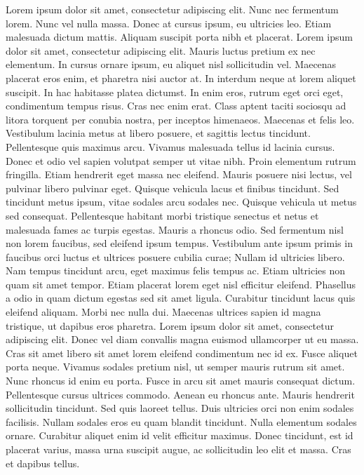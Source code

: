 Lorem ipsum dolor sit amet, consectetur adipiscing elit. Nunc nec fermentum lorem. Nunc vel nulla massa. Donec at cursus ipsum, eu ultricies leo. Etiam malesuada dictum mattis. Aliquam suscipit porta nibh et placerat. Lorem ipsum dolor sit amet, consectetur adipiscing elit. Mauris luctus pretium ex nec elementum. In cursus ornare ipsum, eu aliquet nisl sollicitudin vel. Maecenas placerat eros enim, et pharetra nisi auctor at.
In interdum neque at lorem aliquet suscipit. In hac habitasse platea dictumst. In enim eros, rutrum eget orci eget, condimentum tempus risus. Cras nec enim erat. Class aptent taciti sociosqu ad litora torquent per conubia nostra, per inceptos himenaeos. Maecenas et felis leo. Vestibulum lacinia metus at libero posuere, et sagittis lectus tincidunt. Pellentesque quis maximus arcu. Vivamus malesuada tellus id lacinia cursus. Donec et odio vel sapien volutpat semper ut vitae nibh. Proin elementum rutrum fringilla. Etiam hendrerit eget massa nec eleifend. Mauris posuere nisi lectus, vel pulvinar libero pulvinar eget. Quisque vehicula lacus et finibus tincidunt.
Sed tincidunt metus ipsum, vitae sodales arcu sodales nec. Quisque vehicula ut metus sed consequat. Pellentesque habitant morbi tristique senectus et netus et malesuada fames ac turpis egestas. Mauris a rhoncus odio. Sed fermentum nisl non lorem faucibus, sed eleifend ipsum tempus. Vestibulum ante ipsum primis in faucibus orci luctus et ultrices posuere cubilia curae; Nullam id ultricies libero. Nam tempus tincidunt arcu, eget maximus felis tempus ac. Etiam ultricies non quam sit amet tempor. Etiam placerat lorem eget nisl efficitur eleifend. Phasellus a odio in quam dictum egestas sed sit amet ligula. Curabitur tincidunt lacus quis eleifend aliquam. Morbi nec nulla dui.
Maecenas ultrices sapien id magna tristique, ut dapibus eros pharetra. Lorem ipsum dolor sit amet, consectetur adipiscing elit. Donec vel diam convallis magna euismod ullamcorper ut eu massa. Cras sit amet libero sit amet lorem eleifend condimentum nec id ex. Fusce aliquet porta neque. Vivamus sodales pretium nisl, ut semper mauris rutrum sit amet. Nunc rhoncus id enim eu porta.
Fusce in arcu sit amet mauris consequat dictum. Pellentesque cursus ultrices commodo. Aenean eu rhoncus ante. Mauris hendrerit sollicitudin tincidunt. Sed quis laoreet tellus. Duis ultricies orci non enim sodales facilisis. Nullam sodales eros eu quam blandit tincidunt. Nulla elementum sodales ornare. Curabitur aliquet enim id velit efficitur maximus. Donec tincidunt, est id placerat varius, massa urna suscipit augue, ac sollicitudin leo elit et massa. Cras et dapibus tellus.


